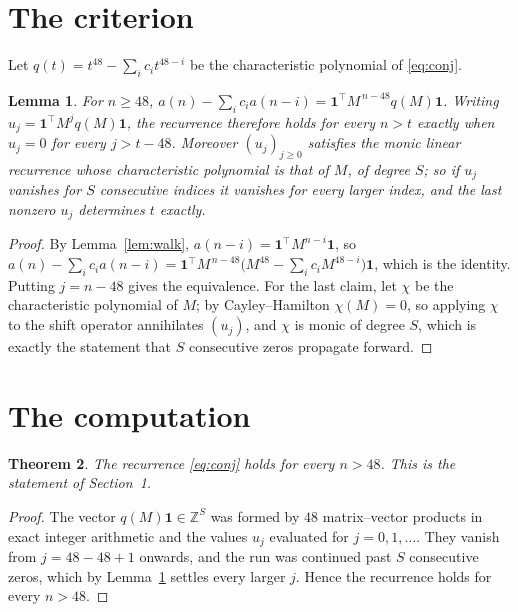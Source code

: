 \documentclass[11pt,a4paper]{article}
\theoremstyle{plain}
\newtheorem{theorem}{Theorem}
\newtheorem{lemma}[theorem]{Lemma}
\theoremstyle{definition}
\begin{document}
\section{The criterion}

Let $q(t)=t^{48}-\sum_i c_i t^{48-i}$ be the characteristic polynomial of
\eqref{eq:conj}.

\begin{lemma}\label{lem:crit}
For $n\ge48$,
$a(n)-\sum_i c_i a(n-i)=\mathbf{1}^{\!\top}M^{\,n-48}q(M)\mathbf{1}$. Writing
$u_j=\mathbf{1}^{\!\top}M^{j}q(M)\mathbf{1}$, the recurrence therefore holds for every
$n>t$ exactly when $u_j=0$ for every $j>t-48$. Moreover $(u_j)_{j\ge0}$ satisfies the
monic linear recurrence whose characteristic polynomial is that of $M$, of degree $S$; so
if $u_j$ vanishes for $S$ consecutive indices it vanishes for every larger index, and the
last nonzero $u_j$ determines $t$ exactly.
\end{lemma}

\begin{proof}
By Lemma~\ref{lem:walk}, $a(n-i)=\mathbf{1}^{\!\top}M^{n-i}\mathbf{1}$, so
$a(n)-\sum_i c_i a(n-i)
=\mathbf{1}^{\!\top}M^{\,n-48}\bigl(M^{48}-\sum_i c_i M^{48-i}\bigr)
\mathbf{1}$, which is the identity. Putting $j=n-48$ gives the equivalence. For the
last claim, let $\chi$ be the characteristic polynomial of $M$; by Cayley--Hamilton
$\chi(M)=0$, so applying $\chi$ to the shift operator annihilates $(u_j)$, and $\chi$ is
monic of degree $S$, which is exactly the statement that $S$ consecutive zeros propagate
forward.
\end{proof}

\section{The computation}

\begin{theorem}
The recurrence \eqref{eq:conj} holds for every $n>48$. This is the statement of
Section~1.
\end{theorem}

\begin{proof}
The vector $q(M)\mathbf{1}\in\mathbb{Z}^{S}$ was formed by $48$ matrix--vector
products in exact integer arithmetic and the values $u_j$ evaluated for
$j=0,1,\dots$. They vanish from $j=48-48+1$ onwards, and the run was continued past
$S$ consecutive zeros, which by Lemma~\ref{lem:crit} settles every larger $j$. Hence the
recurrence holds for every $n>48$.
\end{proof}
\end{document}
